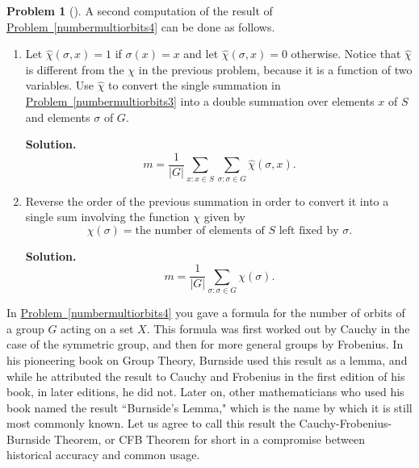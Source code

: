 \documentclass[10pt,]{book}
\theoremstyle{plain}
\theoremstyle{definition}
\newtheorem{activity}[project]{Problem}
\theoremstyle{definition}
\numberwithin{equation}{chapter}
\begin{document}
\begin{activity}[]\label{numbermultiorbits5}
A second computation of the result of \hyperref[numbermultiorbits4]{Problem~\ref{numbermultiorbits4}} can be done as follows.%
\begin{enumerate}[font=\bfseries,label=(\alph*),ref=\alph*]
\item\label{task-224} Let \(\widehat{\chi}(\sigma,x)=1\) if \(\sigma(x)=x\) and let \(\widehat{\chi}(\sigma,x) =0\) otherwise.  Notice that \(\widehat{\chi}\) is different from the \(\chi\) in the previous problem, because it is a function of two variables. Use \(\widehat{\chi}\) to convert the single summation in \hyperref[numbermultiorbits3]{Problem~\ref{numbermultiorbits3}} into a double summation over elements \(x\) of \(S\) and elements \(\sigma\) of \(G\).%
\par\medskip\noindent%
\textbf{Solution.}\quad %
\begin{equation*}
m=\frac{1}{|G|}\sum_{x:x\in S}\sum_{\sigma:\sigma\in G}
\widehat{\chi}(\sigma,x).
\end{equation*}
%
\item\label{task-225} Reverse the order of the previous summation in order to convert it into a single sum involving the function \(\chi\) given by%
\begin{equation*}
\chi(\sigma) =
\mbox{the number of elements of \(S\) left fixed by \(\sigma\)} .
\end{equation*}
%
\par\medskip\noindent%
\textbf{Solution.}\quad %
\begin{equation*}
m=\frac{1}{|G|}\sum_{\sigma:\sigma \in G} \chi(\sigma)\text{.}
\end{equation*}
%
\end{enumerate}
\end{activity}
In \hyperref[numbermultiorbits4]{Problem~\ref{numbermultiorbits4}} you gave a formula for the number of orbits of a group \(G\) acting on a set \(X\). This formula was first worked out by Cauchy in the case of the symmetric group, and then for more general groups by Frobenius. In his pioneering book on Group Theory, Burnside used this result as a lemma, and while he attributed the result to Cauchy and Frobenius in the first edition of his book, in later editions, he did not. Later on, other mathematicians who used his book named the result ``Burnside's Lemma," which is the name by which it is still most commonly known. Let us agree to call this result the Cauchy-Frobenius-Burnside Theorem, or CFB Theorem for short in a compromise between historical accuracy and common usage.%
\end{document}
